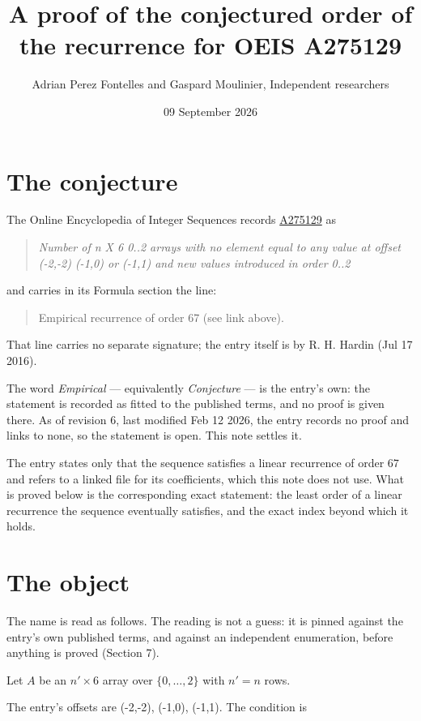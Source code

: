 \documentclass[11pt]{article}
\title{A proof of the conjectured order of the recurrence for OEIS A275129}
\author{Adrian Perez Fontelles and Gaspard Moulinier, Independent researchers}
\date{09 September 2026}
\theoremstyle{definition}
\begin{document}
\maketitle
\section{The conjecture}

The Online Encyclopedia of Integer Sequences records \href{https://oeis.org/A275129}{A275129} as

\begin{quote}\itshape Number of n X 6 0..2 arrays with no element equal to any value at offset (-2,-2) (-1,0) or (-1,1) and new values introduced in order 0..2\end{quote}

and carries in its Formula section the line:

\begin{quote}\ttfamily Empirical recurrence of order 67 (see link above).\end{quote}

That line carries no separate signature; the entry itself is by R. H. Hardin (Jul 17 2016).

The word {\itshape Empirical} --- equivalently {\itshape Conjecture} --- is the entry's own: the statement is recorded as fitted to the published terms, and no proof is given there. As of revision 6, last modified Feb 12 2026, the entry records no proof and links to none, so the statement is open. This note settles it.

The entry states only that the sequence satisfies a linear recurrence of order $67$ and refers to a linked file for its coefficients, which this note does not use. What is proved below is the corresponding exact statement: the least order of a linear recurrence the sequence eventually satisfies, and the exact index beyond which it holds.

\section{The object}

The name is read as follows. The reading is not a guess: it is pinned against the entry's own published terms, and against an independent enumeration, before anything is proved (Section 7).

Let $A$ be an $n' \times 6$ array over $\{0,\dots,2\}$ with $n' = n$ rows.

The entry's offsets are (-2,-2), (-1,0), (-1,1). The condition is
\end{document}
